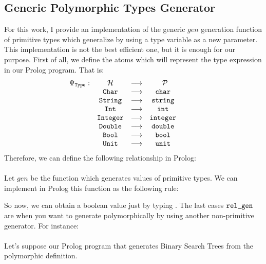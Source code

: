 	\subsection{Generic Polymorphic Types Generator}
	For this work, I provide an implementation of the generic $gen$ generation function of primitive types which generalize by using a type variable as a new parameter. This implementation is not the best efficient one, but it is enough for our purpose. First of all, we define the atoms which will represent the type expression in our Prolog program. That is:
	\begin{equation*}
		\begin{matrix}
			\Psi_{\texttt{Type}}: & \mathcal{H}   & \longrightarrow & \;\; \mathcal{P} &   &   &   \\
			                   & \texttt{Char}    & \longrightarrow & \texttt{char}       &   &   &   \\
			                   & \texttt{String}  & \longrightarrow & \texttt{string}     &   &   &   \\
			                   & \texttt{Int}     & \longrightarrow & \texttt{int}        &   &   &   \\
			                   & \texttt{Integer} & \longrightarrow & \texttt{integer}    &   &   &   \\
			                   & \texttt{Double}  & \longrightarrow & \texttt{double}     &   &   &   \\
			                   & \texttt{Bool}    & \longrightarrow & \texttt{bool}       &   &   &   \\
			                   & \texttt{Unit}    & \longrightarrow & \texttt{unit}       &   &   &   \\
		\end{matrix}
	\end{equation*}
	Therefore, we can define the following relationship in Prolog:\\\\
	Let $gen$ be the function which generates values of primitive types. We can implement in Prolog this function as the following rule:
	
	So now, we can obtain a boolean value just by typing . The last cases $\texttt{rel\_gen}$ are when you want to generate polymorphically by using another non-primitive generator. For instance:\\\\
	Let's suppose our Prolog program that generates Binary Search Trees from the polymorphic definition.

